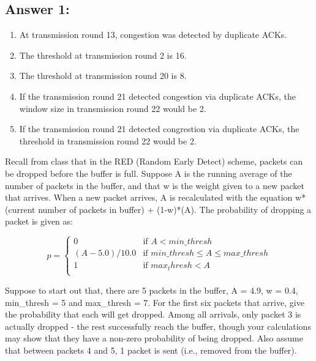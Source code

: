 \documentclass[10pt]{article}
\newenvironment{problem}[2][Problem]{\begin{trivlist}
\item[\hskip \labelsep {\bfseries #1}\hskip \labelsep {\bfseries #2.}]}{\end{trivlist}}
\begin{document}
\subsection*{Answer 1:}
\begin{enumerate}
    \item At transmission round 13, congestion was detected by duplicate ACKs.
    \item The threshold at transmission round 2 is 16.
    \item The threshold at transmission round 20 is 8. 
    \item If the transmission round 21 detected congestion via duplicate ACKs, the window size in transmission round 22 would be 2.
    \item If the transmission round 21 detected congrestion via duplicate ACKs, the threshold in transmission round 22 would be 2.
\end{enumerate}
\begin{problem}{2: RED}
Recall from class that in the RED (Random Early Detect) scheme, packets can be dropped before the buffer is full. Suppose A is the running average of the number of packets in the buffer, and that w is the weight given to a new packet that arrives. When a new packet arrives, A is recalculated with the equation w*(current number of packets in buffer) + (1-w)*(A).
The probability of dropping a packet is given as:

\begin{equation}
p =
    \begin{cases}
        0 & \text{if } A < min\_thresh\\
        (A-5.0)/10.0 & \text{if } min\_thresh \leq A \leq max\_thresh \\
        1 & \text{if } max_thresh < A \\
     \end{cases}
\end{equation}

Suppose to start out that, there are 5 packets in the buffer, A = 4.9, w = 0.4, min\_thresh = 5 and max\_thresh = 7. For the first six packets that arrive, give the probability that each will get dropped. Among all arrivals, only packet 3 is actually dropped - the rest successfully reach the buffer, though your calculations may show that they have a non-zero probability of being dropped. Also assume that between packets 4 and 5, 1 packet is sent (i.e., removed from the buffer).  

\end{problem}
\end{document}
